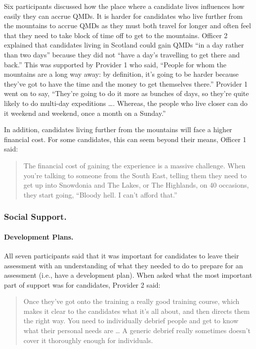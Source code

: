 \documentclass[
  12pt,
  a4paper,
]{book}
\begin{document}
Six participants discussed how the place where a candidate lives influences how easily they can accrue QMDs. It is harder for candidates who live further from the mountains to accrue QMDs as they must both travel for longer and often feel that they need to take block of time off to get to the mountains. Officer 2 explained that candidates living in Scotland could gain QMDs ``in a day rather than two days'' because they did not ``have a day's travelling to get there and back.'' This was supported by Provider 1 who said, ``People for whom the mountains are a long way away: by definition, it's going to be harder because they've got to have the time and the money to get themselves there.'' Provider 1 went on to say, ``They're going to do it more as bunches of days, so they're quite likely to do multi-day expeditions \ldots. Whereas, the people who live closer can do it weekend and weekend, once a month on a Sunday.''

In addition, candidates living further from the mountains will face a higher financial cost. For some candidates, this can seem beyond their means, Officer 1 said:

\begin{quote}
The financial cost of gaining the experience is a massive challenge. When you're talking to someone from the South East, telling them they need to get up into Snowdonia and The Lakes, or The Highlands, on 40 occasions, they start going, ``Bloody hell. I can't afford that.''
\end{quote}

\hypertarget{qual-gta-social-support}{%
\subsubsection{Social Support.}\label{qual-gta-social-support}}

\hypertarget{qual-gta-development-plan}{%
\paragraph{Development Plans.}\label{qual-gta-development-plan}}

All seven participants said that it was important for candidates to leave their assessment with an understanding of what they needed to do to prepare for an assessment (i.e., have a development plan). When asked what the most important part of support was for candidates, Provider 2 said:

\begin{quote}
Once they've got onto the training a really good training course, which makes it clear to the candidates what it's all about, and then directs them the right way. You need to individually debrief people and get to know what their personal needs are \ldots{} A generic debrief really sometimes doesn't cover it thoroughly enough for individuals.
\end{quote}
\end{document}
